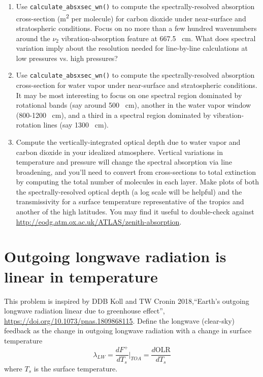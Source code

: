 \documentclass{article}
\begin{document}
\begin{enumerate}

\item Use {\tt calculate\_absxsec\_wn()}  to compute the spectrally-resolved absorption cross-section (\si{\square\meter} per molecule) for carbon dioxide under near-surface and stratospheric conditions. Focus on no more than a few hundred wavenumbers around the $\nu_2$ vibration-absorption feature at 667.5 \si{\per\centi\meter}. What does spectral variation imply about the resolution needed for line-by-line calculations at low pressures vs. high pressures? 

\item Use {\tt calculate\_absxsec\_wn()}  to compute the spectrally-resolved absorption cross-section  for water vapor under near-surface and stratospheric conditions. It may be most interesting to focus on one spectral region dominated by rotational bands (say around 500  \si{\per\centi\meter}), another in the water vapor window (800-1200 \si{\per\centi\meter}), and a third in a spectral region dominated by vibration-rotation lines (say 1300  \si{\per\centi\meter}). 

\item Compute the vertically-integrated optical depth due to water vapor and carbon dioxide in your idealized atmosphere. Vertical variations in temperature and pressure will change the spectral absorption via  line  broadening, and you'll need to convert from cross-sections to total extinction by computing the total number of molecules in each layer. Make plots of both the spectrally-resolved optical depth (a log scale will be helpful) and the transmissivity for a surface temperature representative of the tropics and another of the high latitudes. You may find it useful to double-check against \url{http://eodg.atm.ox.ac.uk/ATLAS/zenith-absorption}. 

\end{enumerate}
\newpage
\section{Outgoing longwave radiation is linear in temperature}

This problem is inspired by DDB Koll and TW Cronin 2018,``Earth’s outgoing longwave radiation linear due to  greenhouse effect'', \url{https://doi.org/10.1073/pnas.1809868115}. Define the longwave (clear-sky) feedback as the change in outgoing longwave radiation with a change in surface temperature 
\begin{equation}
\lambda_{LW} = \frac{d F^+}{d T_{s}}\bigg|_{TOA} = \frac{d \textrm{OLR}}{d T_{s}}
\end{equation}
where $T_s$ is the surface temperature. 
\end{document}
